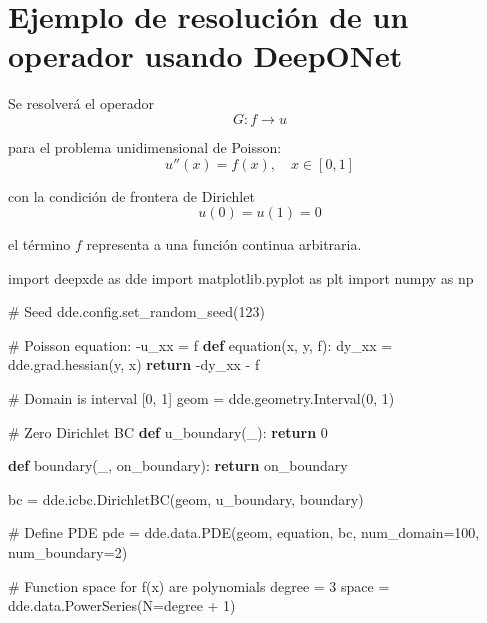 \documentclass[
  spanish,
  us-letterpaper,
]{scrreprt}
\newenvironment{Shaded}{\begin{snugshade}}{\end{snugshade}}
\newcommand{\CommentTok}[1]{\textcolor[rgb]{0.37,0.37,0.37}{#1}}
\newcommand{\ControlFlowTok}[1]{\textcolor[rgb]{0.00,0.23,0.31}{\textbf{#1}}}
\newcommand{\DecValTok}[1]{\textcolor[rgb]{0.68,0.00,0.00}{#1}}
\newcommand{\ImportTok}[1]{\textcolor[rgb]{0.00,0.46,0.62}{#1}}
\newcommand{\KeywordTok}[1]{\textcolor[rgb]{0.00,0.23,0.31}{\textbf{#1}}}
\newcommand{\NormalTok}[1]{\textcolor[rgb]{0.00,0.23,0.31}{#1}}
\newcommand{\OperatorTok}[1]{\textcolor[rgb]{0.37,0.37,0.37}{#1}}
\theoremstyle{plain}
\theoremstyle{definition}
\theoremstyle{remark}
\begin{document}
\section{Ejemplo de resolución de un operador usando
DeepONet}\label{ejemplo-de-resoluciuxf3n-de-un-operador-usando-deeponet}

Se resolverá el operador \[
G: f\rightarrow u
\]

para el problema unidimensional de Poisson: \[
u''(x) = f(x), \quad x\in[0,1]
\]

con la condición de frontera de Dirichlet \[
u(0)=u(1)=0
\]

el término \(f\) representa a una función continua arbitraria.

\begin{Shaded}
\begin{Highlighting}[]
\ImportTok{import}\NormalTok{ deepxde }\ImportTok{as}\NormalTok{ dde}
\ImportTok{import}\NormalTok{ matplotlib.pyplot }\ImportTok{as}\NormalTok{ plt}
\ImportTok{import}\NormalTok{ numpy }\ImportTok{as}\NormalTok{ np}

\CommentTok{\# Seed}
\NormalTok{dde.config.set\_random\_seed(}\DecValTok{123}\NormalTok{)}

\CommentTok{\# Poisson equation: {-}u\_xx = f}
\KeywordTok{def}\NormalTok{ equation(x, y, f):}
\NormalTok{    dy\_xx }\OperatorTok{=}\NormalTok{ dde.grad.hessian(y, x)}
    \ControlFlowTok{return} \OperatorTok{{-}}\NormalTok{dy\_xx }\OperatorTok{{-}}\NormalTok{ f}

\CommentTok{\# Domain is interval [0, 1]}
\NormalTok{geom }\OperatorTok{=}\NormalTok{ dde.geometry.Interval(}\DecValTok{0}\NormalTok{, }\DecValTok{1}\NormalTok{)}

\CommentTok{\# Zero Dirichlet BC}
\KeywordTok{def}\NormalTok{ u\_boundary(\_):}
    \ControlFlowTok{return} \DecValTok{0}

\KeywordTok{def}\NormalTok{ boundary(\_, on\_boundary):}
    \ControlFlowTok{return}\NormalTok{ on\_boundary}

\NormalTok{bc }\OperatorTok{=}\NormalTok{ dde.icbc.DirichletBC(geom, u\_boundary, boundary)}

\CommentTok{\# Define PDE}
\NormalTok{pde }\OperatorTok{=}\NormalTok{ dde.data.PDE(geom, equation, bc, num\_domain}\OperatorTok{=}\DecValTok{100}\NormalTok{, num\_boundary}\OperatorTok{=}\DecValTok{2}\NormalTok{)}

\CommentTok{\# Function space for f(x) are polynomials}
\NormalTok{degree }\OperatorTok{=} \DecValTok{3}
\NormalTok{space }\OperatorTok{=}\NormalTok{ dde.data.PowerSeries(N}\OperatorTok{=}\NormalTok{degree }\OperatorTok{+} \DecValTok{1}\NormalTok{)}


\end{Highlighting}
\end{Shaded}
\end{document}
